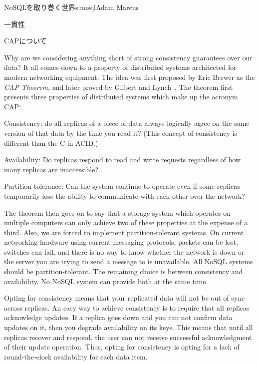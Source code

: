 \begin{aosachapter}{NoSQLを取り巻く世界}{s:nosql}{Adam Marcus}
\begin{aosasect1}{一貫性}
\begin{aosasect2}{CAPについて}

Why are we considering anything short of strong consistency guarantees
over our data?  It all comes down to a property of distributed systems
architected for modern networking equipment.  The idea was first
proposed by Eric Brewer as the \emph{CAP Theorem}, and later proved by
Gilbert and Lynch~\cite{bib:captheorem}.  The theorem first presents three
properties of distributed systems which make up the acronym CAP:

\begin{aosadescription}

  \item{Consistency}: do all replicas of a piece of data always
  logically agree on the same version of that data by the time you
  read it?  (This concept of consistency is different than the C in ACID.)

  \item{Availability}: Do replicas respond to read and write requests regardless
  of how many replicas are inaccessible?

  \item{Partition tolerance}: Can the system continue to operate
  even if some replicas temporarily lose the ability to communicate
  with each other over the network?

\end{aosadescription}

The theorem then goes on to say that a storage system which operates on
multiple computers can only achieve two of these properties at the
expense of a third.  Also, we are forced to implement partition-tolerant
systems.  On current networking
hardware using current messaging protocols, packets can be lost,
switches can fail, and there is no way to know whether the network is
down or the server you are trying to send a message to is unavailable.
All NoSQL systems should be partition-tolerant.  The remaining choice
is between consistency and availability.  No NoSQL system can provide
both at the same time.

Opting for consistency means that your replicated data will not be out
of sync across replicas.  An easy way to achieve consistency is to
require that all replicas acknowledge updates.  If a replica goes down
and you can not confirm data updates on it, then you degrade
availability on its keys.  This means that until all replicas recover and respond, the user can not
receive successful acknowledgment of their update operation.  Thus, opting
for consistency is opting for a lack of round-the-clock availability
for each data item.


\end{aosasect2}
\end{aosasect1}
\end{aosachapter}
